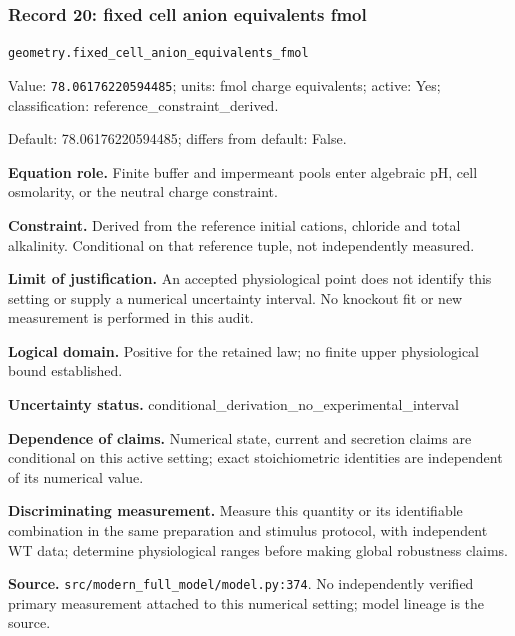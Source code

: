 \subsubsection*{Record 20: fixed cell anion equivalents fmol}
{\small \nolinkurl{geometry.fixed_cell_anion_equivalents_fmol}\par

Value: \texttt{78.06176220594485}; units: fmol charge equivalents; active: Yes; classification: reference\_constraint\_derived.\par

Default: 78.06176220594485; differs from default: False.\par

\textbf{Equation role.} Finite buffer and impermeant pools enter algebraic pH, cell osmolarity, or the neutral charge constraint.\par

\textbf{Constraint.} Derived from the reference initial cations, chloride and total alkalinity. Conditional on that reference tuple, not independently measured.\par

\textbf{Limit of justification.} An accepted physiological point does not identify this setting or supply a numerical uncertainty interval. No knockout fit or new measurement is performed in this audit.\par

\textbf{Logical domain.} Positive for the retained law; no finite upper physiological bound established.\par

\textbf{Uncertainty status.} conditional\_derivation\_no\_experimental\_interval\par

\textbf{Dependence of claims.} Numerical state, current and secretion claims are conditional on this active setting; exact stoichiometric identities are independent of its numerical value.\par

\textbf{Discriminating measurement.} Measure this quantity or its identifiable combination in the same preparation and stimulus protocol, with independent WT data; determine physiological ranges before making global robustness claims.\par

\textbf{Source.} \nolinkurl{src/modern_full_model/model.py:374}. No independently verified primary measurement attached to this numerical setting; model lineage is the source.\par}

